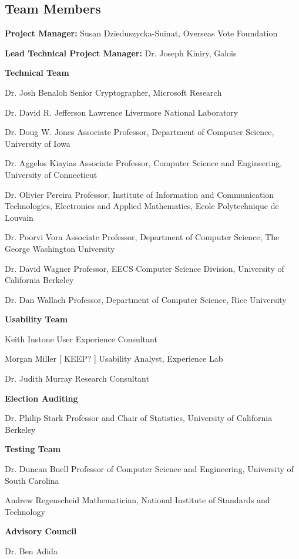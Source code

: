 \subsection{Team Members}

\textbf{Project Manager:} Susan Dzieduszycka-Suinat, Overseas Vote Foundation

\textbf{Lead Technical Project Manager:} Dr. Joseph Kiniry, Galois

\textbf{Technical Team}

Dr. Josh Benaloh
Senior Cryptographer, Microsoft Research
 
Dr. David R. Jefferson
Lawrence Livermore National Laboratory
 
Dr. Doug W. Jones
Associate Professor, Department of Computer Science, University of Iowa
 
Dr. Aggelos Kiayias
Associate Professor, Computer Science and Engineering, University of Connecticut
 
Dr. Olivier Pereira
Professor, Institute of Information and Communication Technologies, Electronics and Applied Mathematics, Ecole Polytechnique de Louvain
 
Dr. Poorvi Vora
Associate Professor, Department of Computer Science, The George Washington University
 
Dr. David Wagner
Professor, EECS Computer Science Division, University of California Berkeley
 
Dr. Dan Wallach
Professor, Department of Computer Science, Rice University
 
\textbf{Usability Team}

Keith Instone
User Experience Consultant

Morgan Miller [ KEEP? ]
Usability Analyst, Experience Lab

Dr. Judith Murray
Research Consultant
 
\textbf{Election Auditing}

Dr. Philip Stark
Professor and Chair of Statistics, University of California Berkeley
 
\textbf{Testing Team}

Dr. Duncan Buell
Professor of Computer Science and Engineering, University of South Carolina
 
Andrew Regenscheid
Mathematician, National Institute of Standards and Technology
 
\textbf{Advisory Council}

Dr. Ben Adida
 
